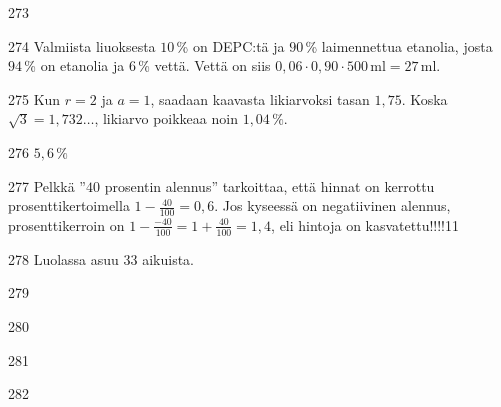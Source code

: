 \begin{Vastaus}{273}
	
\end{Vastaus}
\begin{Vastaus}{274}
	Valmiista liuoksesta $10\,$\% on DEPC:tä ja $90\,$\% laimennettua etanolia, josta $94\,$\% on etanolia ja $6$\,\% vettä. Vettä on siis $0,06\cdot0,90\cdot500$\,ml$=27$\,ml.
	
\end{Vastaus}
\begin{Vastaus}{275}
    Kun $r=2$ ja $a=1$, saadaan kaavasta likiarvoksi tasan $1,75$. Koska $\sqrt{3}=1,732\ldots$, likiarvo poikkeaa noin $1,04\,\%$.
    
\end{Vastaus}
\begin{Vastaus}{276}
        $5,6\,\%$
    
\end{Vastaus}
\begin{Vastaus}{277}
	Pelkkä ''$40$ prosentin alennus'' tarkoittaa, että hinnat on kerrottu prosenttikertoimella $1-\frac{40}{100}=0,6$. Jos kyseessä on negatiivinen alennus, prosenttikerroin on $1-\frac{-40}{100}=1+\frac{40}{100}=1,4$, eli hintoja on kasvatettu!!!!11
	
\end{Vastaus}
\begin{Vastaus}{278}
	Luolassa asuu $33$ aikuista.
	
\end{Vastaus}
\begin{Vastaus}{279}
	
\end{Vastaus}
\begin{Vastaus}{280}
	
\end{Vastaus}
\begin{Vastaus}{281}
	
\end{Vastaus}
\begin{Vastaus}{282}
	
\end{Vastaus}
